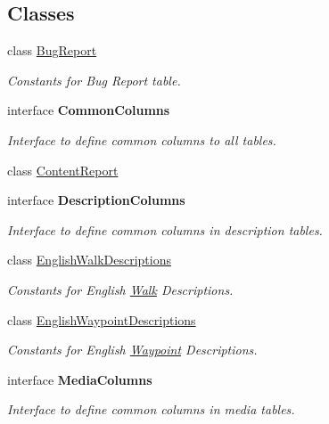 \subsection*{Classes}
\begin{DoxyCompactItemize}
\item 
class \hyperlink{classuk_1_1ac_1_1swan_1_1digitaltrails_1_1database_1_1_white_rock_contract_1_1_bug_report}{Bug\+Report}
\begin{DoxyCompactList}\small\item\em Constants for Bug Report table. \end{DoxyCompactList}\item 
interface {\bfseries Common\+Columns}
\begin{DoxyCompactList}\small\item\em Interface to define common columns to all tables. \end{DoxyCompactList}\item 
class \hyperlink{classuk_1_1ac_1_1swan_1_1digitaltrails_1_1database_1_1_white_rock_contract_1_1_content_report}{Content\+Report}
\item 
interface {\bfseries Description\+Columns}
\begin{DoxyCompactList}\small\item\em Interface to define common columns in description tables. \end{DoxyCompactList}\item 
class \hyperlink{classuk_1_1ac_1_1swan_1_1digitaltrails_1_1database_1_1_white_rock_contract_1_1_english_walk_descriptions}{English\+Walk\+Descriptions}
\begin{DoxyCompactList}\small\item\em Constants for English \hyperlink{classuk_1_1ac_1_1swan_1_1digitaltrails_1_1database_1_1_white_rock_contract_1_1_walk}{Walk} Descriptions. \end{DoxyCompactList}\item 
class \hyperlink{classuk_1_1ac_1_1swan_1_1digitaltrails_1_1database_1_1_white_rock_contract_1_1_english_waypoint_descriptions}{English\+Waypoint\+Descriptions}
\begin{DoxyCompactList}\small\item\em Constants for English \hyperlink{classuk_1_1ac_1_1swan_1_1digitaltrails_1_1database_1_1_white_rock_contract_1_1_waypoint}{Waypoint} Descriptions. \end{DoxyCompactList}\item 
interface {\bfseries Media\+Columns}
\begin{DoxyCompactList}\small\item\em Interface to define common columns in media tables. \end{DoxyCompactList}\item 

\end{DoxyCompactItemize}
